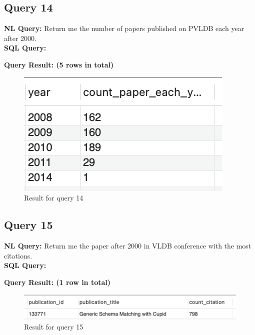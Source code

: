 \documentclass{article}
\begin{document}
\subsection{Query 14}
\textbf{NL Query:} Return me the number of papers published on PVLDB each year after 2000.
\vspace{6 pt}
\\
\textbf{SQL Query:}

\textbf{Query Result: (5 rows in total)}
\begin{figure}[h]
	\centering
	\includegraphics[width=.2\textheight]{figures/q14_res.png}
	\caption{Result for query 14}
	\label{fig:015}
\end{figure}
\subsection{Query 15}
\textbf{NL Query:} Return me the paper after 2000 in VLDB conference with the most citations.
\vspace{6 pt}
\\
\textbf{SQL Query:}

\textbf{Query Result: (1 row in total)}
\begin{figure}[h]
	\centering
	\includegraphics[width=.4\textheight]{figures/q15_res.png}
	\caption{Result for query 15}
	\label{fig:016}
\end{figure}
\end{document}
